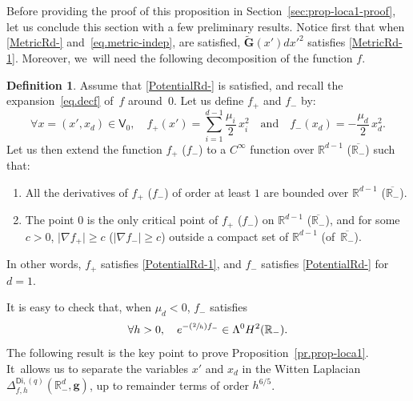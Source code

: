 \documentclass[JEP,XML,SOM,Unicode,NoEqCountersInSection,NoFloatCountersInSection,published]{cedram}
\newcommand{\Psfrac}[2]{(\sfrac{#1}{#2})}
\newcommand{\quand}{\quad\text{and}\quad}
\newcommand{\mbf}[1]{\mathbf{#1}}
\theoremstyle{plain}
\theoremstyle{definition}
\newtheorem{definition}[proposition]{Definition}
\begin{document}
Before providing the proof of this proposition in
Section~\ref{sec:prop-loca1-proof}, let us conclude
this section with a few preliminary results. Notice first that when \ref{MetricRd-} and~\eqref{eq.metric-indep}, are
satisfied, $\tilde{\mbf G}(x') dx'^2$ satisfies
\ref{MetricRd-1}. Moreover, we~will need the following decomposition of the
function $f$.

\begin{definition}\label{de.pre1}
Assume that \ref{PotentialRd-} is satisfied, and recall the
expansion~\eqref{eq.decf} of~$f$ around~$0$.
Let us define $f_+$ and $f_-$ by:
\begin{equation}\label{eq.plusmoins}
\forall x=(x',x_d)\in \mathsf V_0,\quad f_+(x')= \sum_{i=1}^{ d-1}\frac{\mu_i}{2} \, x_i^2 \quand f_-(x_d)=-\frac{\mu_{d}}{2}\, x_d^2.
\end{equation}
Let us then extend the function $f_+$ (\resp $f_-$) to a $C^\infty$
function over $ {\mathbb R^{d-1}}$ (\resp $\overline{\mathbb R_-}$)
such that:
\begin{enumerate}
\item\label{de.pre11}
All the derivatives of $f_+$ (\resp $f_-$) of order at least $1$
are bounded over $ {\mathbb R^{d-1}}$ (\resp $\overline{\mathbb R_-}$).
\item\label{de.pre12}
The point $0$ is the only critical point of $f_+$ (\resp $f_-$) on $ {\mathbb R^{d-1}}$ (\resp $\overline{\mathbb R_-}$), and for some $c>0$, $\vert \nabla f_+\vert \ge c$ (\resp $\vert \nabla f_-\vert \ge c$) outside a compact set of $ {\mathbb R^{d-1}}$ (\resp of~$\overline{\mathbb R_-}$).
\end{enumerate}
In other words, $f_+$ satisfies \ref{PotentialRd-1}, and $f_-$ satisfies \ref{PotentialRd-} for $d=1$.
\end{definition}

It is easy to check that, when $\mu_{d}<0$, $f_-$ satisfies
\begin{equation}\label{eq.f-ext}
\forall h>0,\quad e^{-\Psfrac 2h f_-}\in \Lambda^0H^2(\mathbb R_-).
\end{equation}
The following result is the key point to prove Proposition~\ref{pr.prop-loca1}. It~allows us to separate the variables $x'$ and $x_d$ in the Witten
Laplacian $\Delta_{f,h}^{\mathsf{Di},(q)}(\mathbb R^d_-, \mbf g)$, up
to remainder terms of order $h^{6/5}$.
\end{document}
